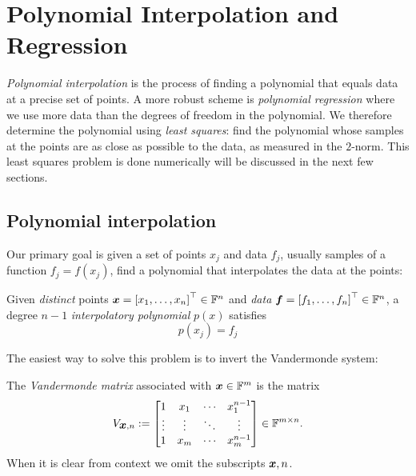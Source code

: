 
\section{Polynomial Interpolation and Regression}
\emph{Polynomial interpolation} is the process of finding a polynomial that equals data at a precise set of points. A more robust scheme is \emph{polynomial regression} where we use more data than the degrees of freedom in the polynomial. We therefore determine the polynomial using \emph{least squares}: find the polynomial whose samples at the points are as close as possible to the data, as measured in the $2$-norm. This least squares problem is done numerically will be discussed in the next few sections.

\subsection{Polynomial interpolation}
Our primary goal is given a set of points $x_j$ and data $f_j$, usually samples of a function $f_j = f(x_j)$, find a polynomial that interpolates the data at the points:

\begin{definition} Given \emph{distinct} points $\ensuremath{\bm{\x}} = \vectt[x_1,\ensuremath{\ldots},x_n] \ensuremath{\in} \ensuremath{\bbF}^n$ and \emph{data} $\ensuremath{\bm{\f}} = \vectt[f_1,\ensuremath{\ldots},f_n] \ensuremath{\in} \ensuremath{\bbF}^n$, a degree $n-1$ \emph{interpolatory polynomial} $p(x)$ satisfies
\[
p(x_j) = f_j
\]
\end{definition}

The easiest way to solve this problem is to invert the Vandermonde system:

\begin{definition}[Vandermonde] The \emph{Vandermonde matrix} associated with $\bm{{\mbox{\boldmath$x$\unboldmath}}} \in {\mathbb F}^m$ is the matrix
\[
V_{\ensuremath{\bm{\x}},n} := \begin{bmatrix} 1 & x_1 & \ensuremath{\cdots} & x_1^{n-1} \\
                    \ensuremath{\vdots} & \ensuremath{\vdots} & \ensuremath{\ddots} & \ensuremath{\vdots} \\
                    1 & x_m & \ensuremath{\cdots} & x_m^{n-1}
                    \end{bmatrix} \ensuremath{\in} \ensuremath{\bbF}^{m \ensuremath{\times} n}.
\]
When it is clear from context we omit the subscripts $\bm{{\mbox{\boldmath$x$\unboldmath}}},n$. \end{definition}

